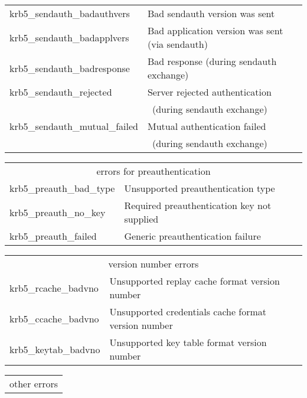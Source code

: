 \begin{small}
\begin{tabular}{ll}
{\sc krb5_sendauth_badauthvers }& Bad sendauth version was sent \\
{\sc krb5_sendauth_badapplvers }& Bad application version was sent (via sendauth) \\
{\sc krb5_sendauth_badresponse }& Bad response (during sendauth exchange) \\
{\sc krb5_sendauth_rejected }& Server rejected authentication\\
& \ (during sendauth exchange) \\
{\sc krb5_sendauth_mutual_failed }& Mutual authentication failed\\&\ (during sendauth exchange) \\

\end{tabular}

\begin{tabular}{ll}
\multicolumn{2}{c}{errors for preauthentication} \\

{\sc krb5_preauth_bad_type }& Unsupported preauthentication type \\
{\sc krb5_preauth_no_key }&	 Required preauthentication key not supplied \\
{\sc krb5_preauth_failed }&	 Generic preauthentication failure \\

\end{tabular}

\begin{tabular}{ll}
\multicolumn{2}{c}{version number errors} \\

{\sc krb5_rcache_badvno }& Unsupported replay cache format version number \\
{\sc krb5_ccache_badvno }& Unsupported credentials cache format version number \\
{\sc krb5_keytab_badvno }& Unsupported key table format version number \\

\end{tabular}

\begin{tabular}{ll}
\multicolumn{2}{c}{other errors} \\ 


\end{tabular}
\end{small}
